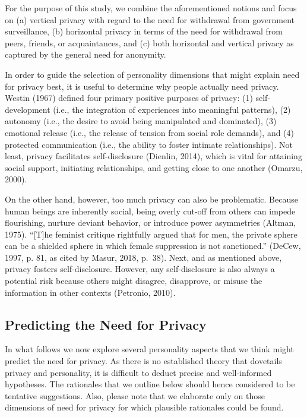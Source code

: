 \documentclass[man,floatsintext]{apa6}
\begin{document}
For the purpose of this study, we combine the aforementioned notions and focus on (a) vertical privacy with regard to the need for withdrawal from government surveillance, (b) horizontal privacy in terms of the need for withdrawal from peers, friends, or acquaintances, and (c) both horizontal and vertical privacy as captured by the general need for anonymity.

In order to guide the selection of personality dimensions that might explain need for privacy best, it is useful to determine why people actually need privacy. Westin (1967) defined four primary positive purposes of privacy: (1) self-development (i.e., the integration of experiences into meaningful patterns), (2) autonomy (i.e., the desire to avoid being manipulated and dominated), (3) emotional release (i.e., the release of tension from social role demands), and (4) protected communication (i.e., the ability to foster intimate relationships). Not least, privacy facilitates self-disclosure (Dienlin, 2014), which is vital for attaining social support, initiating relationships, and getting close to one another (Omarzu, 2000).

On the other hand, however, too much privacy can also be problematic. Because human beings are inherently social, being overly cut-off from others can impede flourishing, nurture deviant behavior, or introduce power asymmetries (Altman, 1975). \enquote{{[}T{]}he feminist critique rightfully argued that for men, the private sphere can be a shielded sphere in which female suppression is not sanctioned.} (DeCew, 1997, p. 81, as cited by Masur, 2018, p.~38). Next, and as mentioned above, privacy fosters self-disclosure. However, any self-disclosure is also always a potential risk because others might disagree, disapprove, or misuse the information in other contexts (Petronio, 2010).

\hypertarget{predicting-the-need-for-privacy}{%
\subsection{Predicting the Need for Privacy}\label{predicting-the-need-for-privacy}}

In what follows we now explore several personality aspects that we think might predict the need for privacy. As there is no established theory that dovetails privacy and personality, it is difficult to deduct precise and well-informed hypotheses. The rationales that we outline below should hence considered to be tentative suggestions. Also, please note that we elaborate only on those dimensions of need for privacy for which plausible rationales could be found.
\end{document}
